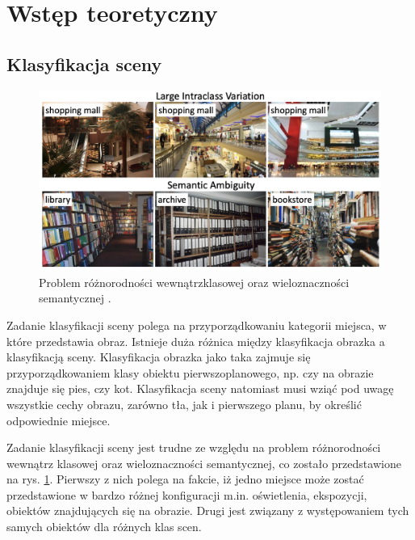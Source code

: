 \section{Wstęp teoretyczny}
\subsection{Klasyfikacja sceny}
\begin{figure}
    \includegraphics[width=\textwidth]{images/scene_class.png}
    \caption{Problem różnorodności wewnątrzklasowej oraz wieloznaczności semantycznej \cite{zeng2021deep}.}
    \label{fig:scene-class}
\end{figure}

Zadanie klasyfikacji sceny polega na przyporządkowaniu kategorii miejsca, w które przedstawia obraz. Istnieje duża różnica między klasyfikacja obrazka a klasyfikacją sceny. Klasyfikacja obrazka jako taka zajmuje się przyporządkowaniem klasy obiektu pierwszoplanowego, np. czy na obrazie znajduje się pies, czy kot. Klasyfikacja sceny natomiast musi wziąć pod uwagę wszystkie cechy obrazu, zarówno tła, jak i pierwszego planu, by określić odpowiednie miejsce.

Zadanie klasyfikacji sceny jest trudne ze względu na problem różnorodności wewnątrz klasowej oraz wieloznaczności semantycznej, co zostało przedstawione na rys. \ref{fig:scene-class}. Pierwszy z nich polega na fakcie, iż jedno miejsce może zostać przedstawione w bardzo różnej konfiguracji m.in. oświetlenia, ekspozycji, obiektów znajdujących się na obrazie. Drugi jest związany z występowaniem tych samych obiektów dla różnych klas scen.

